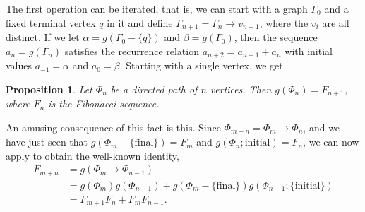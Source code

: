 \documentclass{article}
\newcommand{\fibo}[1]{F_{#1}}
\newcommand{\hthref}[1]{\hyperref[#1]{\thref{#1}}}
\theoremstyle{plain}
\newtheorem{prop}{Proposition}[section]
\theoremstyle{definition}
\begin{document}
The first operation can be iterated, that is, we can start with a graph $\Gamma_0$ and a fixed terminal vertex $q$ in it and define $\Gamma_{n + 1} = \Gamma_{n} \rightarrow v_{n + 1}$, where the $v_i$ are all distinct. If we let $\alpha = g(\Gamma_0 - \{q\})$ and $\beta = g(\Gamma_0)$, then the sequence $a_n = g(\Gamma_n)$ satisfies the recurrence relation $a_{n + 2} = a_{n + 1} + a_{n}$ with initial values $a_{-1} = \alpha$ and $a_0 = \beta$. Starting with a single vertex, we get

\begin{prop}
	Let $\Phi_n$ be a directed path of $n$ vertices. Then $g(\Phi_n) = \fibo{n + 1}$, where $\fibo{n}$ is the Fibonacci sequence.
\end{prop}

An amusing consequence of this fact is this. Since $\Phi_{m + n} = \Phi_m \rightarrow \Phi_n$, and we have just seen that $g(\Phi_m - \{\text{final}\}) = \fibo{m}$ and $g(\Phi_n; \text{initial}) = \fibo{n}$, 
we can now apply \hyperref[eustick]{\hthref{eustick}} to obtain the well-known identity, \eqnspace
\begin{align*}
	\fibo{m + n} &= g(\Phi_m \rightarrow \Phi_{n - 1}) \\
	&= g(\Phi_m)g(\Phi_{n - 1}) + g(\Phi_m - \{\text{final}\})g(\Phi_{n - 1}; \{\text{initial}\}) \\
	&= \fibo{m + 1}\fibo{n} + \fibo{m}\fibo{n - 1}.
\end{align*}
\end{document}
